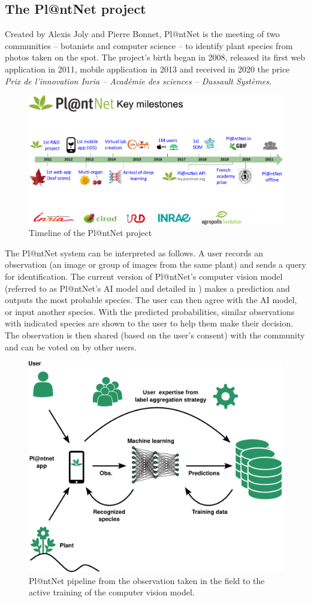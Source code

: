 \subsection{The Pl@ntNet project}
Created by Alexis Joly and Pierre Bonnet, Pl@ntNet \citep{plantet} is the meeting of two communities -- botanists and computer science -- to identify plant species from photos taken on the spot.
The project's birth began in 2008, released its first web application in 2011, mobile application in 2013 and received in 2020 the price \emph{Prix de l’innovation Inria – Académie des sciences – Dassault Systèmes}.
\begin{figure}[tbh]
    \centering
    \includegraphics[width=.8\textwidth, clip, trim={0cm 0cm 0cm 2.5cm}]{chapters/images/Pl@ntNet-overview-Janv-2022.pdf}
    \caption{Timeline of the Pl@ntNet project}
    \label{fig:timeline-plantnet}
\end{figure}

The Pl@ntNet system can be interpreted as follows. A user records an observation (an image or group of images from the same plant) and sends a query for identification.
The current version of Pl@ntNet's computer vision model (referred to as Pl@ntNet's AI model and detailed in ) makes a prediction and outputs the most probable species.
The user can then agree with the AI model, or input another species.
With the predicted probabilities, similar observations with indicated species are shown to the user to help them make their decision.
The observation is then shared (based on the user's consent) with the community and can be voted on by other users.

\begin{figure}[htb]
    \centering
    \includegraphics[width=.65\textwidth]{chapters/images/plantnet_schema_global_green.pdf}
    \caption{Pl@ntNet pipeline from the observation taken in the field to the active training of the computer vision model.}
    \label{fig:pipeline-plantnet}
\end{figure}

